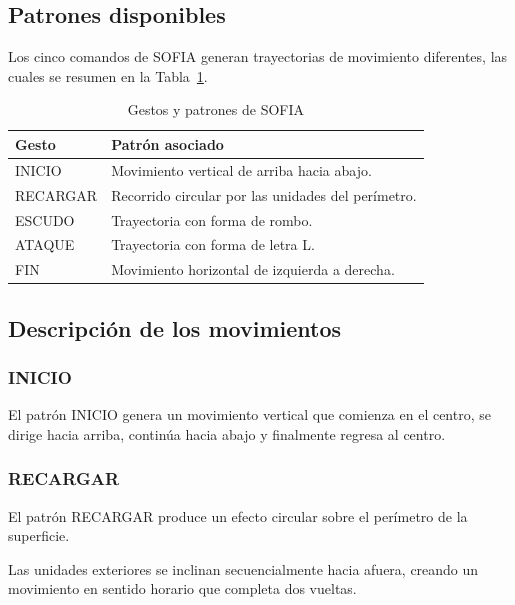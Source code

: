 \documentclass[letterpaper,journal]{IEEEtran}
\begin{document}
\subsection{Patrones disponibles}

Los cinco comandos de SOFIA generan
trayectorias de movimiento diferentes,
las cuales se resumen en la
Tabla~\ref{tab:patrones_sofia}.

\begin{table}[!t]
    \caption{Gestos y patrones de SOFIA}
    \label{tab:patrones_sofia}
    \centering
    \footnotesize
    \begin{tabularx}{\columnwidth}{l X}
        \toprule
        \textbf{Gesto} & \textbf{Patrón asociado} \\
        \midrule
        INICIO & Movimiento vertical de
        arriba hacia abajo. \\
        RECARGAR & Recorrido circular
        por las unidades del perímetro. \\
        ESCUDO & Trayectoria con
        forma de rombo. \\
        ATAQUE & Trayectoria con
        forma de letra L. \\
        FIN & Movimiento horizontal
        de izquierda a derecha. \\
        \bottomrule
    \end{tabularx}
\end{table}

\subsection{Descripción de los movimientos}

\subsubsection{INICIO}

El patrón INICIO genera un movimiento
vertical que comienza en el centro,
se dirige hacia arriba, continúa hacia
abajo y finalmente regresa al centro.

\subsubsection{RECARGAR}

El patrón RECARGAR produce un efecto
circular sobre el perímetro de la superficie.

Las unidades exteriores se inclinan
secuencialmente hacia afuera, creando
un movimiento en sentido horario que
completa dos vueltas.
\end{document}
